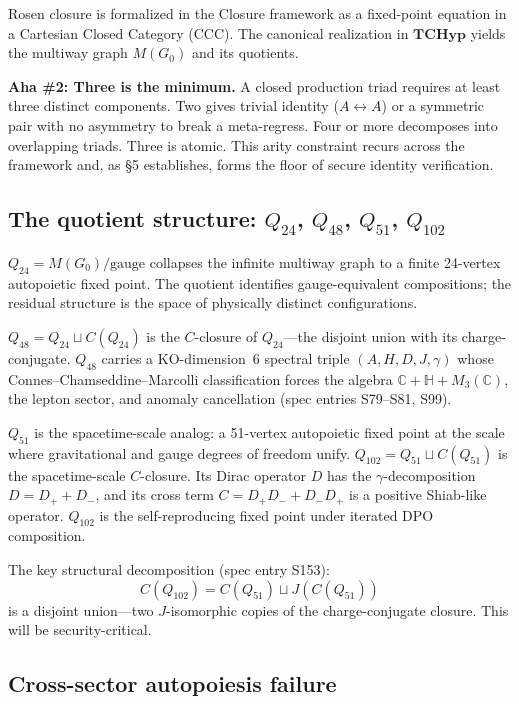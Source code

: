 \documentclass[11pt,a4paper]{article}
\theoremstyle{definition}
\theoremstyle{remark}
\newcommand{\aha}[2]{\medskip\textbf{Aha \##1: #2}}
\begin{document}
Rosen closure is formalized in the Closure framework as a fixed-point equation in a Cartesian Closed Category (CCC). The canonical realization in $\mathbf{TCHyp}$ yields the multiway graph $M(G_0)$ and its quotients.

\aha{2}{Three is the minimum.} A closed production triad requires at least three distinct components. Two gives trivial identity ($A \leftrightarrow A$) or a symmetric pair with no asymmetry to break a meta-regress. Four or more decomposes into overlapping triads. Three is atomic. This arity constraint recurs across the framework and, as \S5 establishes, forms the floor of secure identity verification.

\subsection{The quotient structure: \texorpdfstring{$Q_{24}$, $Q_{48}$, $Q_{51}$, $Q_{102}$}{Q24, Q48, Q51, Q102}}

$Q_{24} = M(G_0)/\text{gauge}$ collapses the infinite multiway graph to a finite 24-vertex autopoietic fixed point. The quotient identifies gauge-equivalent compositions; the residual structure is the space of physically distinct configurations.

$Q_{48} = Q_{24} \sqcup C(Q_{24})$ is the $C$-closure of $Q_{24}$---the disjoint union with its charge-conjugate. $Q_{48}$ carries a KO-dimension~6 spectral triple $(A, H, D, J, \gamma)$ whose Connes--Chamseddine--Marcolli classification forces the algebra $\mathbb{C} + \mathbb{H} + M_3(\mathbb{C})$, the lepton sector, and anomaly cancellation (spec entries S79--S81, S99).

$Q_{51}$ is the spacetime-scale analog: a 51-vertex autopoietic fixed point at the scale where gravitational and gauge degrees of freedom unify. $Q_{102} = Q_{51} \sqcup C(Q_{51})$ is the spacetime-scale $C$-closure. Its Dirac operator $D$ has the $\gamma$-decomposition $D = D_+ + D_-$, and its cross term $C = D_+D_- + D_-D_+$ is a positive Shiab-like operator. $Q_{102}$ is the self-reproducing fixed point under iterated DPO composition.

The key structural decomposition (spec entry S153):
\begin{equation}
C(Q_{102}) = C(Q_{51}) \sqcup J(C(Q_{51}))
\end{equation}
is a disjoint union---two $J$-isomorphic copies of the charge-conjugate closure. This will be security-critical.

\subsection{Cross-sector autopoiesis failure}
\end{document}
